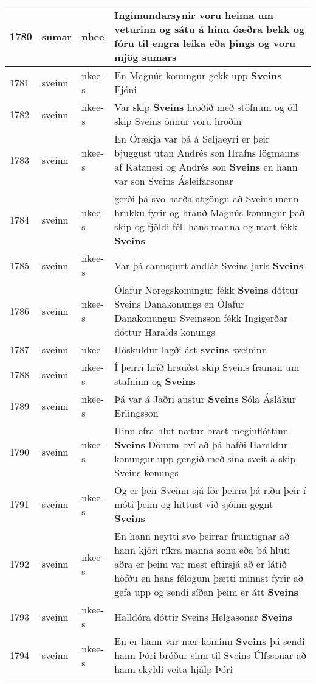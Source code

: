 \documentclass{article}
\begin{document}
\begin{longtable}{p{1cm}|p{1cm}|p{1cm}|p{13cm}}
\hline
1780&sumar&nhee&Ingimundarsynir voru heima um veturinn og sátu á hinn óæðra bekk og fóru til engra leika eða þings og voru mjög \textbf{sumars} \\
\hline
1781&sveinn&nkee-s&En Magnús konungur gekk upp \textbf{Sveins} Fjóni\\
\hline
1782&sveinn&nkee-s&Var skip \textbf{Sveins} hroðið með stöfnum og öll skip Sveins önnur voru hroðin\\
\hline
1783&sveinn&nkee-s&En Órækja var þá á Seljaeyri er þeir bjuggust utan Andrés son Hrafns lögmanns af Katanesi og Andrés son \textbf{Sveins} en hann var son Sveins Ásleifarsonar\\
\hline
1784&sveinn&nkee-s&gerði þá svo harða atgöngu að Sveins menn hrukku fyrir og hrauð Magnús konungur það skip og fjöldi féll hans manna og mart fékk \textbf{Sveins} \\
\hline
1785&sveinn&nkee-s&Var þá sannspurt andlát Sveins jarls \textbf{Sveins} \\
\hline
1786&sveinn&nkee-s&Ólafur Noregskonungur fékk \textbf{Sveins} dóttur Sveins Danakonungs en Ólafur Danakonungur Sveinsson fékk Ingigerðar dóttur Haralds konungs\\
\hline
1787&sveinn&nkee&Höskuldur lagði ást \textbf{sveins} sveininn\\
\hline
1788&sveinn&nkee-s&Í þeirri hríð hrauðst skip Sveins framan um stafninn og \textbf{Sveins} \\
\hline
1789&sveinn&nkee-s&Þá var á Jaðri austur \textbf{Sveins} Sóla Áslákur Erlingsson\\
\hline
1790&sveinn&nkee-s&Hinn efra hlut nætur brast meginflóttinn \textbf{Sveins} Dönum því að þá hafði Haraldur konungur upp gengið með sína sveit á skip Sveins konungs\\
\hline
1791&sveinn&nkee-s&Og er þeir Sveinn sjá för þeirra þá riðu þeir í móti þeim og hittust við sjóinn gegnt \textbf{Sveins} \\
\hline
1792&sveinn&nkee-s&En hann neytti svo þeirrar frumtignar að hann kjöri ríkra manna sonu eða þá hluti aðra er þeim var mest eftirsjá að er látið höfðu en hans félögum þætti minnst fyrir að gefa upp og sendi síðan þeim er átt \textbf{Sveins} \\
\hline
1793&sveinn&nkee-s&Halldóra dóttir Sveins Helgasonar \textbf{Sveins} \\
\hline
1794&sveinn&nkee-s&En er hann var nær kominn \textbf{Sveins} þá sendi hann Þóri bróður sinn til Sveins Úlfssonar að hann skyldi veita hjálp Þóri\\
\hline

\end{longtable}
\end{document}
